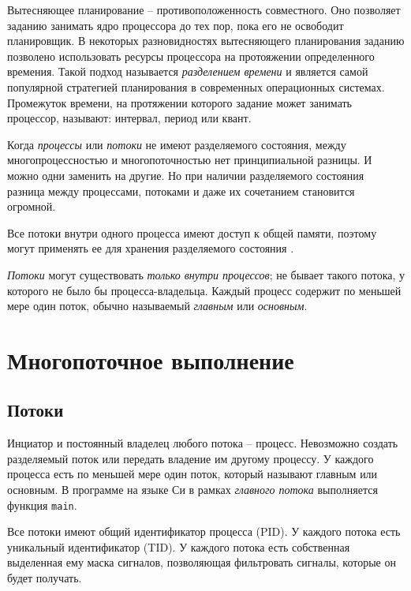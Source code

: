 \documentclass[%
	11pt,
	a4paper,
	utf8,
		]{article}
\begin{document}
Вытесняющее планирование -- противоположенность совместного. Оно позволяет заданию занимать ядро процессора до тех пор, пока его не освободит планировщик. В некоторых разновидностях вытесняющего планирования заданию позволено использовать ресурсы процессора на протояжении определенного времения. Такой подход называется \emph{разделением времени} и является самой популярной стратегией планирования в современных операционных системах. Промежуток времени, на протяжении которого задание может занимать процессор, называют: интервал, период или квант.

Когда \emph{процессы} или \emph{потоки} не имеют разделяемого состояния, между многопроцессностью и многопоточностью нет принципиальной разницы. И можно одни заменить на другие. Но при наличии разделяемого состояния разница между процессами, потоками и даже их сочетанием становится огромной. 

Все потоки внутри одного процесса имеют доступ к общей памяти, поэтому могут применять ее для хранения разделяемого состояния \cite[]{amini-extreme-c:2022}.

\emph{Потоки} могут существовать \emph{только внутри процессов}; не бывает такого потока, у которого не было бы процесса-владельца. Каждый процесс содержит по меньшей мере один поток, обычно называемый \emph{главным} или \emph{основным}.

\section{Многопоточное выполнение}

\subsection{Потоки}

Инциатор и постоянный владелец любого потока -- процесс. Невозможно создать разделяемый поток или передать владение им другому процессу. У каждого процесса есть по меньшей мере один поток, который называют главным или основным. В программе на языке Си в рамках \emph{главного потока} выполняется функция \verb|main|.

Все потоки имеют общий идентификатор процесса (PID). У каждого потока есть уникальный идентификатор (TID). У каждого потока есть собственная выделенная ему маска сигналов, позволяющая фильтровать сигналы, которые он будет получать.
\end{document}
